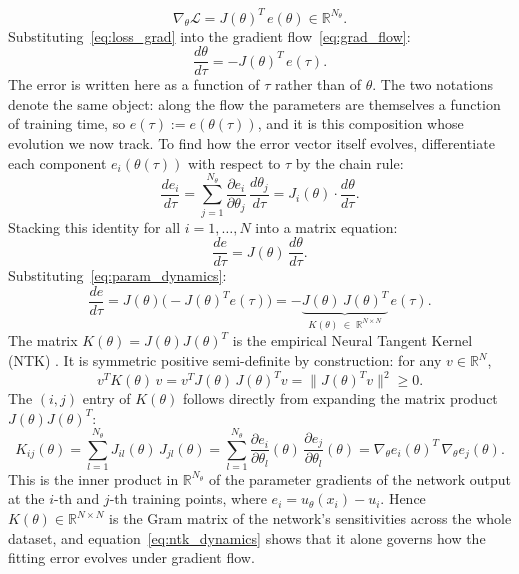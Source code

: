 \begin{equation}\label{eq:loss_grad}
    \nabla_\theta\mathcal{L} = J(\theta)^T\,e(\theta) \in \mathbb{R}^{N_\theta}.
\end{equation}
Substituting~\eqref{eq:loss_grad} into the gradient flow~\eqref{eq:grad_flow}:
\begin{equation}\label{eq:param_dynamics}
    \frac{d\theta}{d\tau} = -J(\theta)^T\,e(\tau).
\end{equation}
The error is written here as a function of $\tau$ rather than of $\theta$. The two notations denote the same object: along the flow the parameters are themselves a function of training time, so $e(\tau) := e(\theta(\tau))$, and it is this composition whose evolution we now track.
To find how the error vector itself evolves, differentiate each component $e_i(\theta(\tau))$ with respect to $\tau$ by the chain rule:
\begin{equation*}
    \frac{de_i}{d\tau}
    = \sum_{j=1}^{N_\theta} \frac{\partial e_i}{\partial \theta_j}\,\frac{d\theta_j}{d\tau}
    = J_i(\theta)\cdot\frac{d\theta}{d\tau}.
\end{equation*}
Stacking this identity for all $i = 1,\ldots,N$ into a matrix equation:
\begin{equation*}
    \frac{de}{d\tau} = J(\theta)\,\frac{d\theta}{d\tau}.
\end{equation*}
Substituting~\eqref{eq:param_dynamics}:
\begin{equation}\label{eq:ntk_dynamics}
    \frac{de}{d\tau}
    = J(\theta)\bigl(-J(\theta)^T e(\tau)\bigr)
    = -\underbrace{J(\theta)\,J(\theta)^T}_{K(\theta)\;\in\;\mathbb{R}^{N\times N}}\,e(\tau).
\end{equation}
The matrix $K(\theta) = J(\theta)J(\theta)^T$ is the empirical Neural Tangent Kernel (NTK) \parencite{jacot2018}. It is symmetric positive semi-definite by construction: for any $v \in \mathbb{R}^{N}$,
\begin{equation*}
    v^T K(\theta)\, v = v^T J(\theta)\,J(\theta)^T v = \bigl\|J(\theta)^T v\bigr\|^2 \geq 0.
\end{equation*}
The $(i,j)$ entry of $K(\theta)$ follows directly from expanding the matrix product $J(\theta)J(\theta)^T$:
\begin{equation*}
    K_{ij}(\theta)
    = \sum_{l=1}^{N_\theta} J_{il}(\theta)\,J_{jl}(\theta)
    = \sum_{l=1}^{N_\theta} \frac{\partial e_i}{\partial\theta_l}(\theta)\,\frac{\partial e_j}{\partial\theta_l}(\theta)
    = \nabla_\theta e_i(\theta)^T\,\nabla_\theta e_j(\theta).
\end{equation*}
This is the inner product in $\mathbb{R}^{N_\theta}$ of the parameter gradients of the network output at the $i$-th and $j$-th training points, where $e_i = u_\theta(x_i) - u_i$. Hence $K(\theta) \in \mathbb{R}^{N \times N}$ is the Gram matrix of the network's sensitivities across the whole dataset, and equation~\eqref{eq:ntk_dynamics} shows that it alone governs how the fitting error evolves under gradient flow.

